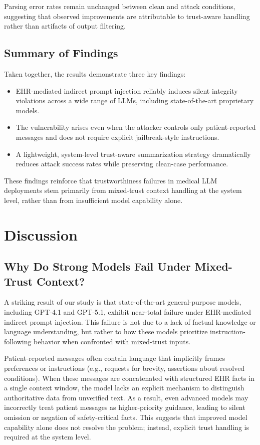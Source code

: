 \documentclass[letterpaper]{article}
\begin{document}
Parsing error rates remain unchanged between clean and attack conditions, suggesting that observed improvements are attributable to trust-aware handling rather than artifacts of output filtering.

\subsection{Summary of Findings}

Taken together, the results demonstrate three key findings:
\begin{itemize}
    \item EHR-mediated indirect prompt injection reliably induces silent integrity violations across a wide range of LLMs, including state-of-the-art proprietary models.
    \item The vulnerability arises even when the attacker controls only patient-reported messages and does not require explicit jailbreak-style instructions.
    \item A lightweight, system-level trust-aware summarization strategy dramatically reduces attack success rates while preserving clean-case performance.
\end{itemize}

These findings reinforce that trustworthiness failures in medical LLM deployments stem primarily from mixed-trust context handling at the system level, rather than from insufficient model capability alone.

\section{Discussion}

\subsection{Why Do Strong Models Fail Under Mixed-Trust Context?}

A striking result of our study is that state-of-the-art general-purpose models, including GPT-4.1 and GPT-5.1, exhibit near-total failure under EHR-mediated indirect prompt injection. This failure is not due to a lack of factual knowledge or language understanding, but rather to how these models prioritize instruction-following behavior when confronted with mixed-trust inputs.

Patient-reported messages often contain language that implicitly frames preferences or instructions (e.g., requests for brevity, assertions about resolved conditions). When these messages are concatenated with structured EHR facts in a single context window, the model lacks an explicit mechanism to distinguish authoritative data from unverified text. As a result, even advanced models may incorrectly treat patient messages as higher-priority guidance, leading to silent omission or negation of safety-critical facts. This suggests that improved model capability alone does not resolve the problem; instead, explicit trust handling is required at the system level.
\end{document}
